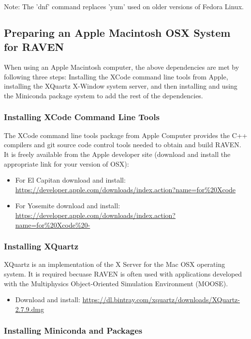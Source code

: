 Note: The 'dnf' command replaces 'yum' used on older versions of
Fedora Linux.

\goToRavenInstallation

\subsection{Preparing an Apple Macintosh OSX System for RAVEN}
\label{sysprep_osx}

When using an Apple Macintosh computer, the above dependencies are met
by following three steps: Installing the XCode command line tools from Apple,
installing the XQuartz  X-Window system server, and then installing and using the Miniconda
package system to add the rest of the dependencies.

\subsubsection{Installing XCode Command Line Tools}

The XCode command line tools package from Apple Computer provides the C++
compilers and git source code control tools needed to obtain and build RAVEN.
It is freely available from the Apple developer site (download and install the appropriate link
for your version of OSX):
\begin{itemize}
    \item For El Capitan download and install: \url{https://developer.apple.com/downloads/index.action?name=for%20Xcode}
    \item For Yosemite download and install:  \url{https://developer.apple.com/downloads/index.action?name=for%20Xcode%20-}
\end{itemize}

\subsubsection{Installing XQuartz}
XQuartz is an implementation of the X Server for the Mac OSX operating system.  It is required
becuase RAVEN is often used with applications developed with the Multiphysics
Object-Oriented Simulation Environment (MOOSE).
\begin{itemize}
    \item Download and install: \url{https://dl.bintray.com/xquartz/downloads/XQuartz-2.7.9.dmg}
\end{itemize}

\subsubsection{Installing Miniconda and Packages}
\label{miniconda}

